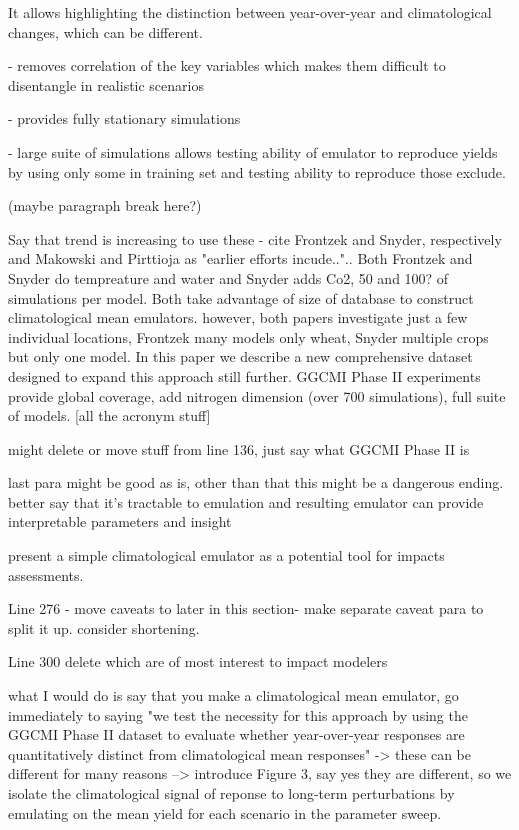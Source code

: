 \documentclass[preprint, 5p, times, twocolumn]{elsarticle}
\begin{document}
It allows highlighting the distinction between year-over-year and climatological changes, which can be different. 

- removes correlation of the key variables which makes them difficult to disentangle in realistic scenarios

- provides fully stationary simulations 

- large suite of simulations allows testing ability of emulator to reproduce yields by using only some in training set and testing ability to reproduce those exclude. 

(maybe paragraph break here?)

Say that trend is increasing to use these  - cite Frontzek and Snyder, respectively and Makowski and Pirttioja as "earlier efforts incude..".. Both Frontzek and Snyder do tempreature and water and Snyder adds Co2, 50 and 100? of simulations per model. Both take advantage of size of database to construct climatological mean emulators. however, both papers investigate just a few individual locations, Frontzek many models only wheat,  Snyder multiple crops but only one model. In this paper we describe a new comprehensive dataset designed to expand this approach still further. GGCMI Phase II experiments provide global coverage, add nitrogen dimension (over 700 simulations), full suite of models. [all the acronym stuff]

might delete or move stuff from line 136, just say what GGCMI Phase II is

last para might be good as is, other than that this might be a dangerous ending. better say that it's tractable to emulation and resulting emulator can provide interpretable parameters and insight

present a simple climatological emulator as a potential tool for impacts assessments.

Line 276 - move caveats to later in this section- make separate caveat para to split it up. consider shortening.

Line 300 delete which are of most interest to impact modelers

what I would do is say that you make a climatological mean emulator, go immediately to saying "we test the necessity for this approach by using the GGCMI Phase II dataset to evaluate whether year-over-year responses are quantitatively distinct from climatological mean responses" -> these can be different for many reasons --> introduce Figure 3, say yes they are different, so we isolate the climatological signal of reponse to long-term perturbations by emulating on the mean yield for each scenario in the parameter sweep.
\end{document}
